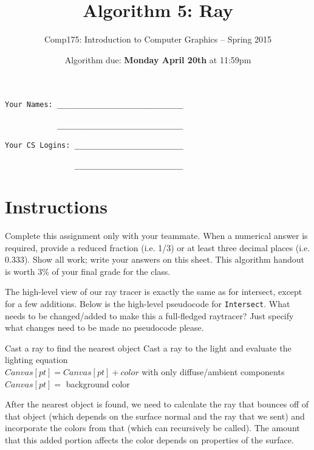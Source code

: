 \documentclass[10pt,twocolumn]{article}
\title{\Huge{\bf Algorithm 5: Ray}}
\author{Comp175: Introduction to Computer Graphics -- Spring 2015}
\date{Algorithm due:  {\bf Monday April 20th} at 11:59pm}                                         %
\begin{document}
\maketitle

\begin{verbatim}
Your Names: _____________________________

            _____________________________

Your CS Logins: _________________________

                _________________________
\end{verbatim}

\section{Instructions}
Complete this assignment only with your teammate. When a numerical answer is required, provide a reduced fraction (i.e. 1/3) or at least three decimal places (i.e. 0.333). Show all work; write your answers on this sheet. This algorithm handout is worth 3\% of your final grade for the class.

\begin{framed}
\noindent{\bf[2 points]} The high-level view of our ray tracer is exactly the same as for intersect, except for a few additions. Below is the high-level pseudocode for {\tt Intersect}. What needs to be changed/added to make this a full-fledged raytracer? Just specify what changes need to be made {no pseudocode please.}

\footnotesize{
\begin{algorithmic}
	\STATE Cast a ray to find the nearest object
			\STATE Cast a ray to the light and evaluate the lighting equation\\
			\STATE $Canvas[pt] = Canvas[pt]+ color$ with only diffuse/ambient components\\
		\ENDFOR
	\ELSE 
		\STATE $Canvas[pt] =$ background color
	\ENDIF
\ENDFOR

\vspace{3em}

After the nearest object is found, we need to calculate the ray that bounces off of that object (which depends on the surface normal and the ray that we sent) and incorporate the colors from that (which can recursively be called). The amount that this added portion affects the color depends on properties of the surface.

\end{algorithmic}
}

\end{framed}
\end{document}
